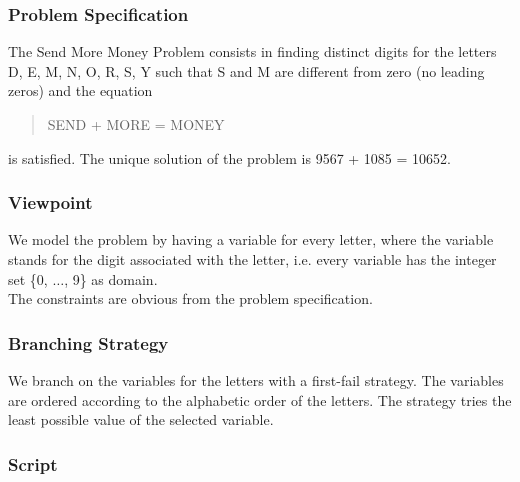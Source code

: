 \documentclass[a4paper]{scrartcl}
\begin{document}
\subsubsection{Problem Specification}
The Send More Money Problem consists in finding 
distinct digits for the letters 
D, E, M, N, O, R, S, Y such that S and M are 
different from zero (no leading zeros) 
and the equation
\begin{quote}
SEND + MORE = MONEY
\end{quote}
is satisfied. The unique solution of the problem 
is 9567 + 1085 = 10652.

\subsubsection{Viewpoint}
We model the problem by having a variable for 
every letter, where the variable 
stands for the digit associated with the letter,
i.e. every variable has the integer set 
\{0, $\ldots$, 9\} as domain.\\
 The constraints are obvious 
from the problem specification.

\subsubsection{Branching Strategy}
\label{distribstrat}
We branch on the variables for the letters 
with a first-fail strategy.
The variables are ordered according to the 
alphabetic order of the letters. 
The strategy tries the least possible value 
of the selected variable. 

\subsubsection{Script}
\end{document}
